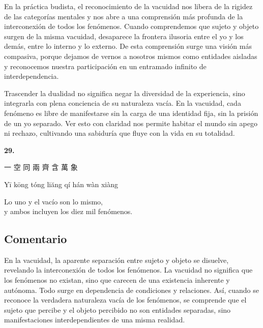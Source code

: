 \documentclass[
  a5paperpaper,
]{article}
\begin{document}
En la práctica budista, el reconocimiento de la vacuidad nos libera de
la rigidez de las categorías mentales y nos abre a una comprensión más
profunda de la interconexión de todos los fenómenos. Cuando comprendemos
que sujeto y objeto surgen de la misma vacuidad, desaparece la frontera
ilusoria entre el yo y los demás, entre lo interno y lo externo. De esta
comprensión surge una visión más compasiva, porque dejamos de vernos a
nosotros mismos como entidades aisladas y reconocemos nuestra
participación en un entramado infinito de interdependencia.

Trascender la dualidad no significa negar la diversidad de la
experiencia, sino integrarla con plena conciencia de su naturaleza
vacía. En la vacuidad, cada fenómeno es libre de manifestarse sin la
carga de una identidad fija, sin la prisión de un yo separado. Ver esto
con claridad nos permite habitar el mundo sin apego ni rechazo,
cultivando una sabiduría que fluye con la vida en su totalidad.

\hfill\break

\hypertarget{04}{}
\begin{verseblock}

\newpage

\begin{center}\textbf{29.}\end{center}

一 空 同 兩 齊 含 萬 象

Yī kōng tóng liăng qí hán wàn xiàng

Lo uno y el vacío son lo mismo,\\
y ambos incluyen los diez mil fenómenos.

\end{verseblock}

\hfill\break

\hypertarget{comentario-28}{%
\subsection{Comentario}\label{comentario-28}}

En la vacuidad, la aparente separación entre sujeto y objeto se
disuelve, revelando la interconexión de todos los fenómenos. La vacuidad
no significa que los fenómenos no existan, sino que carecen de una
existencia inherente y autónoma. Todo surge en dependencia de
condiciones y relaciones. Así, cuando se reconoce la verdadera
naturaleza vacía de los fenómenos, se comprende que el sujeto que
percibe y el objeto percibido no son entidades separadas, sino
manifestaciones interdependientes de una misma realidad.
\end{document}
